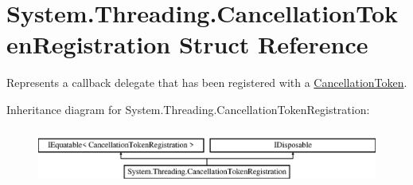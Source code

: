 \hypertarget{struct_system_1_1_threading_1_1_cancellation_token_registration}{}\section{System.\+Threading.\+Cancellation\+Token\+Registration Struct Reference}
\label{struct_system_1_1_threading_1_1_cancellation_token_registration}


Represents a callback delegate that has been registered with a \hyperlink{}{Cancellation\+Token}.  


Inheritance diagram for System.\+Threading.\+Cancellation\+Token\+Registration\+:\begin{figure}[H]
\begin{center}
\leavevmode
\includegraphics[height=1.898305cm]{struct_system_1_1_threading_1_1_cancellation_token_registration}
\end{center}
\end{figure}
